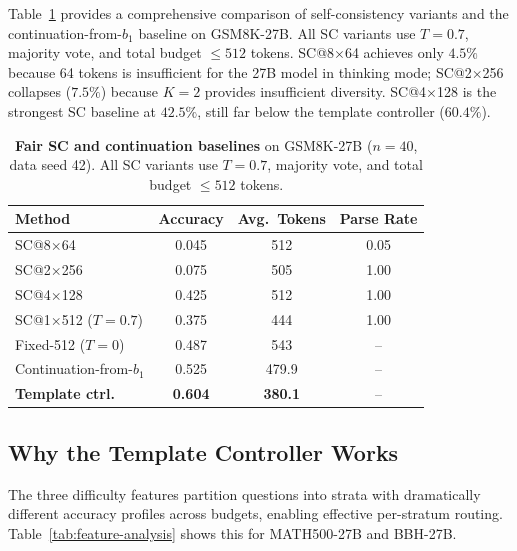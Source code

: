Table~\ref{tab:fair-sc} provides a comprehensive comparison of self-consistency variants and the continuation-from-$b_1$ baseline on GSM8K-27B.
All SC variants use $T{=}0.7$, majority vote, and total budget $\leq 512$ tokens.
SC@8$\times$64 achieves only $4.5\%$ because 64 tokens is insufficient for the 27B model in thinking mode; SC@2$\times$256 collapses ($7.5\%$) because $K{=}2$ provides insufficient diversity.
SC@4$\times$128 is the strongest SC baseline at $42.5\%$, still far below the template controller ($60.4\%$).

\begin{table}[ht]
\centering
\caption{\textbf{Fair SC and continuation baselines} on GSM8K-27B ($n{=}40$, data seed 42). All SC variants use $T{=}0.7$, majority vote, and total budget $\leq 512$ tokens.}
\label{tab:fair-sc}
\small
\begin{tabular}{@{}lccc@{}}
\toprule
\textbf{Method} & \textbf{Accuracy} & \textbf{Avg.\ Tokens} & \textbf{Parse Rate} \\
\midrule
SC@8$\times$64 & 0.045 & 512 & 0.05 \\
SC@2$\times$256 & 0.075 & 505 & 1.00 \\
SC@4$\times$128 & 0.425 & 512 & 1.00 \\
SC@1$\times$512 ($T{=}0.7$) & 0.375 & 444 & 1.00 \\
\midrule
Fixed-512 ($T{=}0$) & 0.487 & 543 & -- \\
Continuation-from-$b_1$ & 0.525 & 479.9 & -- \\
\textbf{Template ctrl.} & \textbf{0.604} & \textbf{380.1} & -- \\
\bottomrule
\end{tabular}
\end{table}

\subsection{Why the Template Controller Works}
\label{app:why-template}

The three difficulty features partition questions into strata with dramatically different accuracy profiles across budgets, enabling effective per-stratum routing.
Table~\ref{tab:feature-analysis} shows this for MATH500-27B and BBH-27B.

